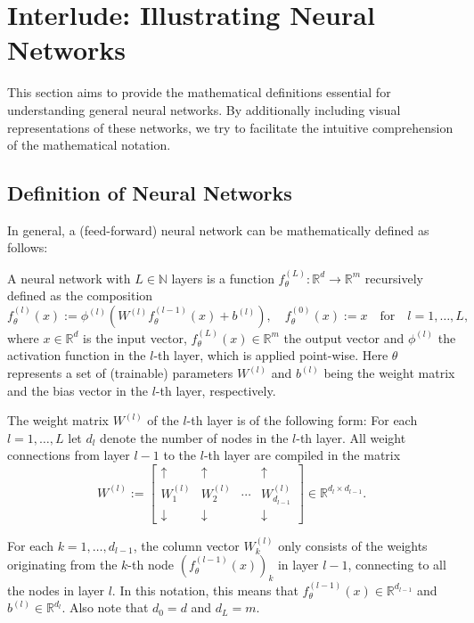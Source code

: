 \documentclass{article}
\begin{document}
\newpage
\section{Interlude: Illustrating Neural Networks}
This section aims to provide the mathematical definitions essential for understanding general neural networks. By additionally including visual representations of these networks, we try to facilitate the intuitive comprehension of the mathematical notation.

\subsection{Definition of Neural Networks}
In general, a (feed-forward) neural network can be mathematically defined as follows:
\begin{definition}\label{def:NN}
A neural network with $L\in\mathbb{N}$ layers is a function $f^{(L)}_\theta:\mathbb{R}^d\to\mathbb{R}^m$ recursively defined as the composition
$$f_\theta^{(l)}(x):=\phi^{(l)}(W^{(l)}f_\theta^{(l-1)}(x)+b^{(l)}),\quad f_\theta^{(0)}(x):=x\quad\text{for}\quad l=1,\dots,L,$$
where $x\in\mathbb{R}^d$ is the input vector, $f_\theta^{(L)}(x)\in\mathbb{R}^m$ the output vector and $\phi^{(l)}$ the activation function in the $l$-th layer, which is applied point-wise. Here $\theta$ represents a set of (trainable) parameters
$W^{(l)}$ and $b^{(l)}$ being the weight matrix and the bias vector in the $l$-th layer, respectively.
\par
The weight matrix $W^{(l)}$ of the $l$-th layer is of the following form: For each $l=1,\dots,L$ let $d_l$ denote the number of nodes in the $l$-th layer. All weight connections from layer $l-1$ to the $l$-th layer are compiled in the matrix
\begin{equation*}
W^{(l)}:=\begin{bmatrix} \uparrow & \uparrow & & \uparrow \\ {W_1^{(l)}} & {W_2^{(l)}} & \cdots & {W_{d_{l-1}}^{(l)}} \\ \downarrow & \downarrow & & \downarrow \end{bmatrix}\in\mathbb{R}^{d_{l}\times d_{l-1}}.
\end{equation*}
\end{definition}
\bigskip
\indent
For each $k=1,\dots,d_{l-1}$, the column vector $W_k^{(l)}$ only consists of the weights originating from the $k$-th node $(f_\theta^{(l-1)}(x))_k$ in layer $l-1$, connecting to all the nodes in layer $l$. In this notation, this means that $f_\theta^{(l-1)}(x)\in\mathbb{R}^{d_{l-1}}$ and $b^{(l)}\in\mathbb{R}^{d_{l}}$. Also note that $d_0=d$ and $d_L=m$.
\end{document}
